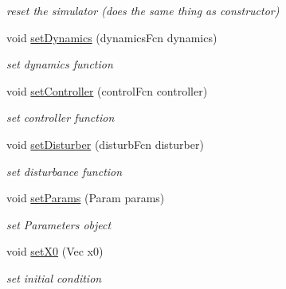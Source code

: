 \begin{DoxyCompactItemize}
\begin{DoxyCompactList}\small\item\em reset the simulator (does the same thing as constructor) \end{DoxyCompactList}\item 
\mbox{\label{classSimulator_af19085bb19ced728593aa27835f6e591}} 
void \mbox{\hyperlink{classSimulator_af19085bb19ced728593aa27835f6e591}{set\+Dynamics}} (dynamics\+Fcn dynamics)
\begin{DoxyCompactList}\small\item\em set dynamics function \end{DoxyCompactList}\item 
\mbox{\label{classSimulator_a53e30a07431c73a9be87657f0eb1b0b4}} 
void \mbox{\hyperlink{classSimulator_a53e30a07431c73a9be87657f0eb1b0b4}{set\+Controller}} (control\+Fcn controller)
\begin{DoxyCompactList}\small\item\em set controller function \end{DoxyCompactList}\item 
\mbox{\label{classSimulator_a77650bca5cc7fd8e71207453339f55a5}} 
void \mbox{\hyperlink{classSimulator_a77650bca5cc7fd8e71207453339f55a5}{set\+Disturber}} (disturb\+Fcn disturber)
\begin{DoxyCompactList}\small\item\em set disturbance function \end{DoxyCompactList}\item 
\mbox{\label{classSimulator_a622af3bddf0b85d4115ba06ca04f1d12}} 
void \mbox{\hyperlink{classSimulator_a622af3bddf0b85d4115ba06ca04f1d12}{set\+Params}} (Param params)
\begin{DoxyCompactList}\small\item\em set Parameters object \end{DoxyCompactList}\item 
\mbox{\label{classSimulator_ae7eeb81e869342f070002c64f5fe67f5}} 
void \mbox{\hyperlink{classSimulator_ae7eeb81e869342f070002c64f5fe67f5}{set\+X0}} (Vec x0)
\begin{DoxyCompactList}\small\item\em set initial condition \end{DoxyCompactList}\item 

\end{DoxyCompactItemize}
